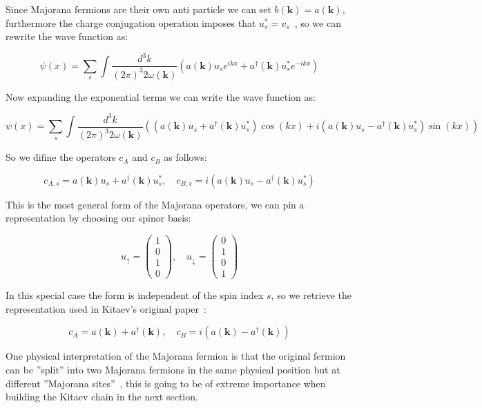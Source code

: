 \documentclass[11pt, a4paper]{article}
\numberwithin{equation}{section}
\begin{document}
Since Majorana fermions are their own anti particle we can set $b(\mathbf{k}) = a(\mathbf{k})$, furthermore the charge conjugation operation imposes
that $u_s^* = v_s$~\cite{Srednicki2007}, so we can rewrite the wave function as:

\begin{equation}
    \psi(x) = \sum_{s} \int \frac{d^3k}{(2 \pi )^3 2\omega(\mathbf{k})} \left( a(\mathbf{k})u_s e^{ikx} + a^\dagger(\mathbf{k}) u_s^* e^{-ikx}\right)
\end{equation}

Now expanding the exponential terms we can write the wave function as:

\begin{equation}
    \psi(x) = \sum_{s} \int \frac{d^3k}{(2 \pi )^3 2\omega(\mathbf{k})} \left( (a(\mathbf{k})u_s + a^\dagger(\mathbf{k})u_s^*)\cos(kx) + i(a(\mathbf{k})u_s - a^\dagger(\mathbf{k})u_s^*)\sin(kx)\right)
\end{equation}

So we difine the operators $c_A$ and $c_B$ as follows:

\begin{equation}
    c_{A,s} = a(\mathbf{k})u_s + a^\dagger(\mathbf{k})u_s^*, \quad c_{B,s} = i(a(\mathbf{k})u_s - a^\dagger(\mathbf{k})u_s^*)
\end{equation}

This is the most general form of the Majorana operators, we can pin a representation by choosing our spinor basis:

\[
u_\uparrow = \begin{pmatrix} 1 \\ 0 \\ 1 \\ 0 \end{pmatrix}, \quad u_\downarrow = \begin{pmatrix} 0 \\ 1 \\ 0 \\ 1 \end{pmatrix}
\]

In this special case the form is independent of the spin index $s$, so we retrieve the representation used in Kitaev's original paper~\cite{Kitaev2000}:

\begin{equation}
    c_A = a(\mathbf{k}) + a^\dagger(\mathbf{k}), \quad c_B = i(a(\mathbf{k}) - a^\dagger(\mathbf{k}))
\end{equation}

One physical interpretation of the Majorana fermion is that the original fermion
can be ''split'' into two Majorana fermions in the same physical position but at different ''Majorana sites''~\cite{Kitaev2000}, this is going to be of
extreme importance when building the Kitaev chain in the next section.
\end{document}
